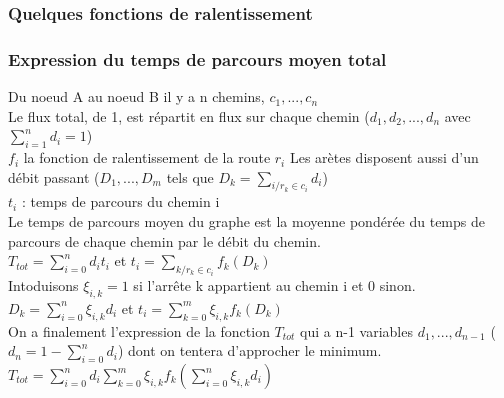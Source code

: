 \documentclass{beamer}
\newcommand {\axes}[4] {\draw[->] (0,0) -- (#3,0) node [right]{#1};
                        \draw[->] (0,0) -- (0,#4) node[above]{#2};}
\newcommand {\valx}[2] {\draw (#1,0.03) -- (#1,-0.03) node[anchor=north]{#2};}
\newcommand {\valy}[2] {\draw (0.03,#1) -- (-0.03,#1) node[anchor=east]{#2};}
\begin{document}
\begin{frame}
    \frametitle{Quelques fonctions de ralentissement}
\end{frame}

\begin{frame}
\frametitle{Expression du temps de parcours moyen total}
\fontsize{8}{6}\selectfont
Du noeud A au noeud B il y a n chemins, $c_1,...,c_n$\\
Le flux total, de 1, est répartit en flux sur chaque chemin ($d_1,d_2,...,d_n$
avec $\sum_{i=1}^n d_i=1$)\\
$f_i$ la fonction de ralentissement de la route $r_i$
Les arètes disposent aussi d'un débit passant ($D_1,...,D_m$ tels que
$D_k = \sum_{i / r_k\in c_i} d_i$)\\
$t_i$ : temps de parcours du chemin i\\
Le temps de parcours moyen du graphe est la moyenne pondérée du temps de
parcours de chaque chemin par le débit du chemin.\\
$T_{tot}=\sum_{i=0}^n d_i t_i$ et
$t_i = \sum_{k/r_k\in c_i} f_k(D_k)$ \\
Intoduisons $\xi_{i,k} = 1$ si l'arrête k appartient au chemin i et 0 sinon.\\
$D_k = \sum_{i=0}^n \xi_{i,k} d_i$ et
$t_i = \sum_{k=0}^m \xi_{i,k} f_k(D_k)$\\
On a finalement l'expression de la fonction $T_{tot}$ qui a n-1 variables
$d_1,...,d_{n-1}$ ($d_n = 1-\sum_{i=0}^n d_i$)
dont on tentera d'approcher le minimum.\\
$T_{tot}=\sum_{i=0}^n d_i \sum_{k=0}^m \xi_{i,k} f_k(\sum_{i=0}^n \xi_{i,k} d_i)$\\
\end{frame}
\end{document}
